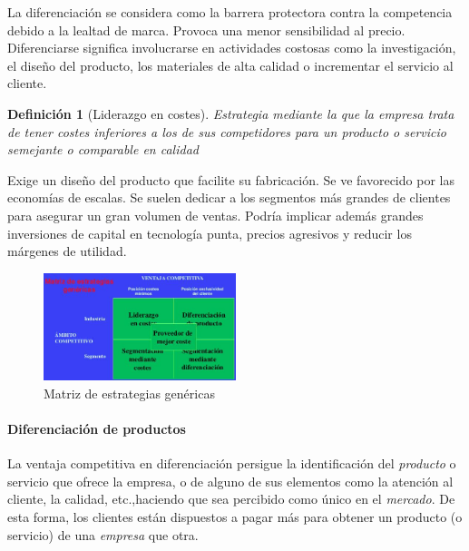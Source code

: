 \documentclass[12pt]{article}
\theoremstyle{definition_wo_parentheses}
\newtheorem{definicion}{Definición}[section]
\begin{document}
La diferenciación se considera como la barrera protectora contra la competencia debido a la lealtad de marca. Provoca una menor sensibilidad al precio. Diferenciarse significa involucrarse en actividades costosas como la investigación, el diseño del producto, los materiales de alta calidad o incrementar el servicio al cliente.

\begin{definicion}[Liderazgo en costes] 
	Estrategia mediante la que la empresa trata de tener costes inferiores a los de sus competidores para un producto o servicio semejante o comparable en calidad
\end{definicion}

Exige un diseño del producto que facilite su fabricación. Se ve favorecido por las economías de escalas. Se suelen dedicar a los segmentos más grandes de clientes para asegurar un gran volumen de ventas. Podría implicar además grandes inversiones de capital en tecnología punta, precios agresivos y reducir los márgenes de utilidad.

\begin{figure}[H]
 \centering
 \includegraphics[width=0.5\textwidth]{matrizEstGenericas}
 \caption{Matriz de estrategias genéricas}
\end{figure}




\paragraph{Diferenciación de productos} La ventaja competitiva en diferenciación persigue la identificación del \textit{producto} o servicio que ofrece la empresa, o de alguno de sus elementos como la atención al cliente, la calidad, etc.,haciendo que sea percibido como único en el \textit{mercado}. De esta forma, los clientes están dispuestos a pagar más para obtener un producto (o servicio) de una \textit{empresa} que otra.
\end{document}
